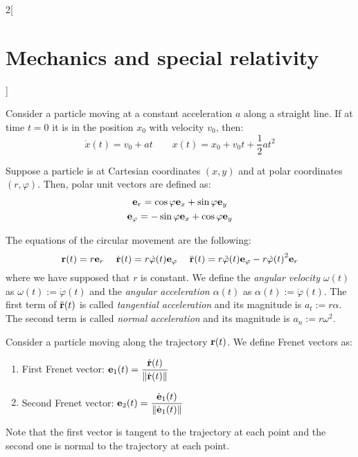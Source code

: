 \documentclass[../../../main.tex]{subfiles}
\begin{document}
\begin{multicols}{2}[\section{Mechanics and special relativity}]
\begin{prop}
  \end{prop}
  \begin{prop}
    Consider a particle moving at a constant acceleration $a$ along a straight line. If at time $t=0$ it is in the position $x_0$ with velocity $v_0$, then:
    $$\dot{x}(t)=v_0+at\qquad x(t)=x_0+v_0t+\frac{1}{2}at^2$$
  \end{prop}
  \begin{definition}
    Suppose a particle is at Cartesian coordinates $(x,y)$ and at polar coordinates $(r,\varphi)$. Then, polar unit vectors are defined as:
    \begin{gather*}
      \boldsymbol{\mathrm{e}}_r=\cos\varphi\boldsymbol{\mathrm{e}}_x+\sin\varphi\boldsymbol{\mathrm{e}}_y\\
      \boldsymbol{\mathrm{e}}_\varphi=-\sin\varphi\boldsymbol{\mathrm{e}}_x+\cos\varphi\boldsymbol{\mathrm{e}}_y
    \end{gather*}
  \end{definition}
  \begin{definition}
    The equations of the circular movement are the following: $$\boldsymbol{\mathrm{r}}(t)=r\boldsymbol{\mathrm{e}}_r\quad\;\dot{\boldsymbol{\mathrm{r}}}(t)=r\dot{\varphi}(t)\boldsymbol{\mathrm{e}}_\varphi\quad\;\ddot{\boldsymbol{\mathrm{r}}}(t)=r\ddot{\varphi}(t)\boldsymbol{\mathrm{e}}_\varphi-r{\dot{\varphi}(t)}^2\boldsymbol{\mathrm{e}}_r$$ where we have supposed that $r$ is constant. We define the \textit{angular velocity $\omega(t)$} as $\omega(t):=\dot{\varphi}(t)$ and the \textit{angular acceleration $\alpha(t)$} as $\alpha(t):=\ddot{\varphi}(t)$. The first term of $\ddot{\boldsymbol{\mathrm{r}}}(t)$ is called \textit{tangential acceleration} and its magnitude is $a_t:=r\alpha$. The second term is called \textit{normal acceleration} and its magnitude is $a_n:=r\omega^2$.
  \end{definition}
  \begin{definition}
    Consider a particle moving along the trajectory $\boldsymbol{\mathrm{r}}(t)$. We define Frenet vectors as:
    \begin{enumerate}
      \item First Frenet vector: $\displaystyle\boldsymbol{\mathrm{e}}_1(t)=\frac{\dot{\boldsymbol{\mathrm{r}}}(t)}{\|\dot{\boldsymbol{\mathrm{r}}}(t)\|}$
      \item Second Frenet vector: $\displaystyle\boldsymbol{\mathrm{e}}_2(t)=\frac{\dot{\boldsymbol{\mathrm{e}}}_1(t)}{\|\dot{\boldsymbol{\mathrm{e}}}_1(t)\|}$
    \end{enumerate}
    Note that the first vector is tangent to the trajectory at each point and the second one is normal to the trajectory at each point.


\end{definition}
\end{multicols}
\end{document}
